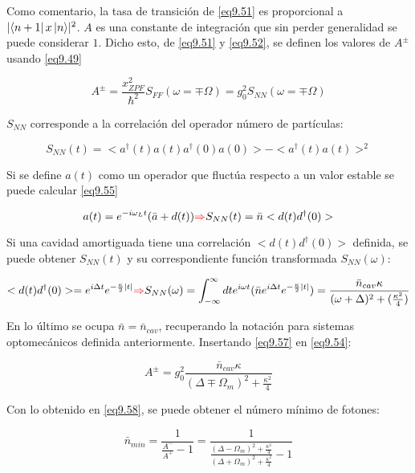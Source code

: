 \documentclass{book}
\begin{document}
Como comentario, la tasa de transición de \ref{eq9.51} es proporcional a $\lvert\bra{n+1}x\ket{n}\rvert^2$. $A$ es una constante de integración que sin perder generalidad se puede considerar $1$. Dicho esto, de \ref{eq9.51} y \ref{eq9.52}, se definen los valores de $A^\pm$ usando \ref{eq9.49}

\begin{equation}\label{eq9.54}A^\pm=\frac{x^2_{ZPF}}{\hslash^2}S_{FF}(\omega=\mp \Omega)=g_0^2S_{NN}(\omega=\mp\Omega)\end{equation}

$S_{NN}$ corresponde a la correlación del operador número de partículas:

\begin{equation}\label{eq9.55}S_{NN}(t)=<a^\dag(t)a(t)a^\dag(0)a(0)>-<a^\dag(t)a(t)>^2\end{equation}

Si se define $a(t)$ como un operador que fluctúa respecto a un valor estable se puede calcular \ref{eq9.55}

\begin{equation}\label{eq9.56}a(t)=e^{-i\omega_L t}(\bar{a}+d(t))\textcolor{red}{\Rightarrow} S_{NN}(t)=\bar{n}<d(t)d^\dag(0)>\end{equation}

Si una cavidad amortiguada tiene una correlación $<d(t)d^\dag(0)>$ definida, se puede obtener $S_{NN}(t)$ y su correspondiente función transformada $S_{NN}(\omega)$:

\begin{equation}\label{eq9.57}<d(t)d^\dag(0)>=e^{i\Delta t}e^{-\frac{\kappa}{2}\lvert t \rvert}\textcolor{red}{\Rightarrow} S_{NN}(\omega)=\int_{-\infty}^\infty dt e^{i\omega t}(\bar{n}e^{i\Delta t}e^{-\frac{\kappa}{2}\lvert t\rvert})=\frac{\bar{n}_{cav}\kappa}{(\omega+\Delta)^2+(\frac{\kappa^2}{4})}\end{equation}

En lo último se ocupa $\bar{n}=\bar{n}_{cav}$, recuperando la notación para sistemas optomecánicos definida anteriormente. Insertando \ref{eq9.57} en \ref{eq9.54}:

\begin{equation}\label{eq9.58}A^\pm=g_0^2\frac{\bar{n}_{cav}\kappa}{(\Delta\mp\Omega_m)^2+\frac{\kappa^2}{4}}\end{equation}

Con lo obtenido en \ref{eq9.58}, se puede obtener el número mínimo de fotones:

\begin{equation}\label{eq9.59}\bar{n}_{min}=\frac{1}{\frac{A^-}{A^+}-1}=\frac{1}{\frac{(\Delta-\Omega_m)^2+\frac{\kappa^2}{4}}{(\Delta+\Omega_m)^2+\frac{\kappa^2}{4}}-1}\end{equation}
\end{document}
